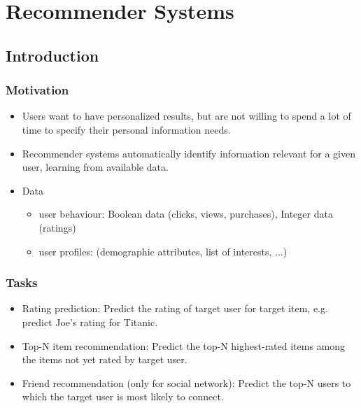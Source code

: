 \documentclass[../notes.tex]{subfiles}
\begin{document}
\section{Recommender Systems}

\subsection{Introduction}
\subsubsection{Motivation}
\begin{itemize}
  \item Users want to have personalized results, but are not willing to spend a lot of time to specify their personal information needs.
  \item Recommender systems automatically identify information relevant for a given user, learning from available data.
  \item Data
  \begin{itemize}
    \item user behaviour: Boolean data (clicks, views, purchases), Integer data (ratings)
    \item user profiles: (demographic attributes, list of interests, ...)
  \end{itemize}
\end{itemize}

\subsubsection{Tasks}
\begin{itemize}
  \item Rating prediction: Predict the rating of target user for target item, e.g. predict Joe’s rating for Titanic.
  \item Top-N item recommendation: Predict the top-N highest-rated items among the items not yet rated by target user.
  \item Friend recommendation (only for social network): Predict the top-N users to which the target user is most likely to connect.
\end{itemize}
\end{document}
